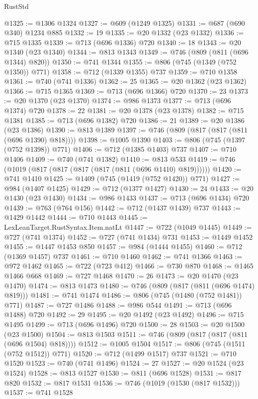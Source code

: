 \begin{lexlean}{RustStd}
\begin{coremodule}
@1325 := @1306 @1324
@1327 := @609 (@1249 @1325)
@1331 := @687 (@690 @340) @1234 @885
@1332 := 19
@1335 := @20 @1332 (@23 @1332)
@1336 := @715 @1335
@1339 := @713 (@696 @1336) @720
@1340 := 18
@1343 := @20 @1340 (@23 @1340)
@1344 := @813 @1343
@1349 := @746 (@809 (@811 (@696 @1344) @820))
@1350 := @741 @1344
@1355 := @806 (@745 (@1349 (@752 @1350)) @771)
@1358 := @712 (@1339 @1355) @737
@1359 := @710 @1358
@1361 := @740 (@741 @1336)
@1362 := 25
@1365 := @20 @1362 (@23 @1362)
@1366 := @715 @1365
@1369 := @713 (@696 @1366) @720
@1370 := 23
@1373 := @20 @1370 (@23 @1370)
@1374 := @986 @1373
@1377 := @713 (@696 @1374) @720
@1378 := 22
@1381 := @20 @1378 (@23 @1378)
@1382 := @715 @1381
@1385 := @713 (@696 @1382) @720
@1386 := 21
@1389 := @20 @1386 (@23 @1386)
@1390 := @813 @1389
@1397 := @746 (@809 (@817 (@817 (@811 (@696 @1390) @818))))
@1398 := @1005 @1390
@1403 := @806 (@745 (@1397 (@752 @1398)) @771)
@1406 := @712 (@1385 @1403) @737
@1407 := @710 @1406
@1409 := @740 (@741 @1382)
@1410 := @813 @533
@1419 := @746 (@1019 (@817 (@817 (@817 (@817 (@811 (@696 @1410) @819))))))
@1420 := @741 @1410
@1425 := @1409 (@745 (@1419 (@752 @1420)) @771)
@1427 := @984 (@1407 @1425)
@1429 := @712 (@1377 @1427)
@1430 := 24
@1433 := @20 @1430 (@23 @1430)
@1434 := @986 @1433
@1437 := @713 (@696 @1434) @720
@1439 := @763 (@764 @156)
@1442 := @712 (@1437 @1439) @737
@1443 := @1429 @1442
@1444 := @710 @1443
@1445 := LexLeanTarget.RustSyntax.Item.natLt
@1447 := @722 (@1049 @1445)
@1449 := @727 (@741 @1374)
@1452 := @727 (@741 @1434) @731
@1453 := @1449 @1452
@1455 := @1447 @1453 @850
@1457 := @984 (@1444 @1455)
@1460 := @712 (@1369 @1457) @737
@1461 := @710 @1460
@1462 := @741 @1366
@1463 := @972 @1462
@1465 := @722 (@723 @412)
@1466 := @730 @870
@1468 := @1465 @1466 @668
@1469 := @727 @1468
@1470 := 26
@1473 := @20 @1470 (@23 @1470)
@1474 := @813 @1473
@1480 := @746 (@809 (@817 (@811 (@696 @1474) @819)))
@1481 := @741 @1474
@1486 := @806 (@745 (@1480 (@752 @1481)) @771)
@1487 := @727 @1486
@1488 := @986 @544
@1491 := @713 (@696 @1488) @720
@1492 := 29
@1495 := @20 @1492 (@23 @1492)
@1496 := @715 @1495
@1499 := @713 (@696 @1496) @720
@1500 := 28
@1503 := @20 @1500 (@23 @1500)
@1504 := @813 @1503
@1511 := @746 (@809 (@817 (@817 (@811 (@696 @1504) @818))))
@1512 := @1005 @1504
@1517 := @806 (@745 (@1511 (@752 @1512)) @771)
@1520 := @712 (@1499 @1517) @737
@1521 := @710 @1520
@1523 := @740 (@741 @1496)
@1524 := 27
@1527 := @20 @1524 (@23 @1524)
@1528 := @813 @1527
@1530 := @811 (@696 @1528)
@1531 := @817 @820
@1532 := @817 @1531
@1536 := @746 (@1019 (@1530 (@817 @1532)))
@1537 := @741 @1528

\end{coremodule}
\end{lexlean}
